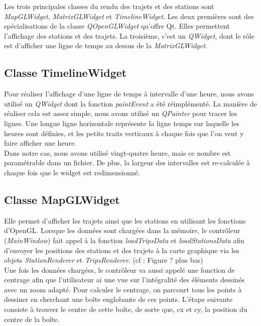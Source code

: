 \documentclass[12pt]{article}
\begin{document}
	Les trois principales classes du rendu des trajets et des stations sont \textit{MapGLWidget}, \textit{MatrixGLWidget} et \textit{TimelineWidget}. Les deux premières sont des spécialisations de la classe \textit{QOpenGLWidget} qu’offre Qt. Elles permettent l’affichage des stations et des trajets. La troisième, c’est un \textit{QWidget}, dont le rôle est d’afficher une ligne de temps au
dessus de la \textit{MatrixGLWidget}.
	
		\subsection{Classe TimelineWidget}
		Pour réaliser l’affichage d’une ligne de temps à intervalle d’une heure, nous avons utilisé un \textit{QWidget} dont la fonction \textit{paintEvent} a été réimplémenté. La manière de réaliser cela est assez simple, nous avons utilisé un \textit{QPainter} pour tracer les lignes. Une longue ligne horizontale représente la ligne temps sur laquelle les heures sont définies, et les petits traits verticaux à chaque fois que l’on veut y faire afficher une heure.\\
Dans notre cas, nous avons utilisé vingt-quatre heure, mais ce nombre est paramétrable dans un fichier. De plus, la largeur des intervalles est re-calculée à  chaque fois que le widget est redimensionné.				
		
		\subsection{Classe MapGLWidget}
		Elle permet d’afficher les trajets ainsi que les stations en utilisant les fonctions d’OpenGL. Lorsque les données sont chargées dans la mémoire, le contrôleur (\textit{MainWindow}) fait appel à la fonction \textit{loadTripsData} et \textit{loadStationsData} afin d’envoyer les positions des stations et des trajets à la carte graphique via les objets \textit{StationRenderer} et \textit{TripsRenderer}. (cf : Figure ? plus bas)\\

		Une fois les données chargées, le contrôleur va aussi appelé une fonction de centrage afin que l’utilisateur ai une vue sur l’intégralité des éléments dessinés avec un zoom adapté.
Pour calculer le centrage, on parcourt tous les points à dessiner en cherchant une boîte englobante de ces points. L’étape suivante consiste à trouver le centre de cette boîte, de sorte que, cx et cy, la position du centre de la boîte.\\
\end{document}
